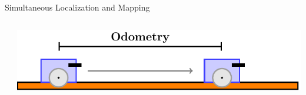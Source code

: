\documentclass{beamer}
\begin{document}
\begin{frame}{Simultaneous Localization and Mapping}
\begin{columns}
\begin{itemize}
\end{itemize}
\vspace{42pt}
\centering
\includegraphics[width=\textwidth]{tikz/odometry.pdf}\\
\end{columns}
\end{frame}
\end{document}
